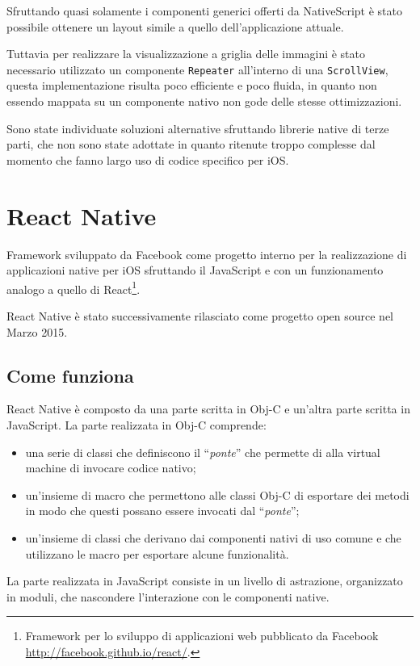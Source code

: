 Sfruttando quasi solamente i componenti generici offerti da NativeScript è stato possibile ottenere un layout simile a quello dell'applicazione attuale.

Tuttavia per realizzare la visualizzazione a griglia delle immagini è stato necessario utilizzato un componente \texttt{Repeater} all'interno di una \texttt{ScrollView}, questa implementazione risulta poco efficiente e poco fluida, in quanto non essendo mappata su un componente nativo non gode delle stesse ottimizzazioni.

Sono state individuate soluzioni alternative sfruttando librerie native di terze parti, che non sono state adottate in quanto ritenute troppo complesse dal momento che fanno largo uso di codice specifico per iOS.

\FloatBarrier
\section{React Native}

Framework sviluppato da Facebook come progetto interno per la realizzazione di applicazioni native per iOS sfruttando il JavaScript e con un funzionamento analogo a quello di React\footnote{Framework per lo sviluppo di applicazioni web pubblicato da Facebook \url{http://facebook.github.io/react/}.}.

React Native è stato successivamente rilasciato come progetto open source nel Marzo 2015.

\subsection{Come funziona}

React Native è composto da una parte scritta in Obj-C e un'altra parte scritta in JavaScript.
La parte realizzata in Obj-C comprende:
\begin{itemize}
\item una serie di classi che definiscono il ``\textit{ponte}'' che permette di alla virtual machine di invocare codice nativo;
\item un'insieme di macro che permettono alle classi Obj-C di esportare dei metodi in modo che questi possano essere invocati dal ``\textit{ponte}'';
\item un'insieme di classi che derivano dai componenti nativi di uso comune e che utilizzano le macro per esportare alcune funzionalità.
\end{itemize}
La parte realizzata in JavaScript consiste in un livello di astrazione, organizzato in moduli, che nascondere l'interazione con le componenti native.

